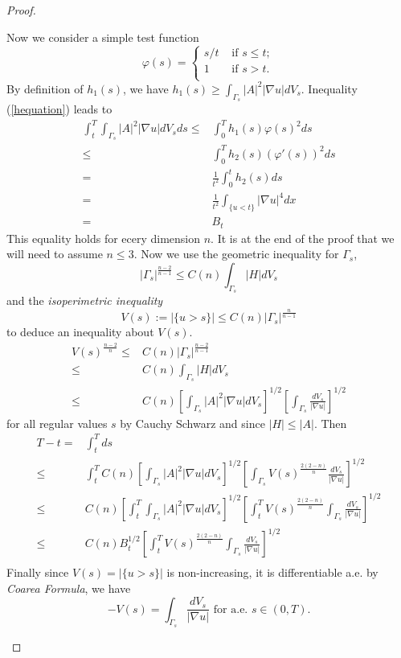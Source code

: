 \documentclass[paper=a4, fontsize=11pt]{scrartcl} %
\numberwithin{equation}{section} %
\numberwithin{figure}{section} %
\numberwithin{table}{section} %
\numberwithin{exercise}{section}
\begin{document}
\begin{proof}
\begin{itemize}
Now we consider a simple test function 
$$\varphi(s)=\begin{cases} s/t & \mbox{ if } s\leq t;\\
1 & \mbox{ if } s>t.\\
\end{cases}$$
By definition of $h_1(s)$, we have $ h_1(s) \geq \int _{\Gamma_s} |A|^2|\nabla u| dV_s.$ Inequality (\ref{hequation}) leads to 
\begin{align*}
\int_{t}^T\int _{\Gamma_s} |A|^2|\nabla u| dV_s ds\leq & \int_{0}^T h_1(s) \varphi(s)^2 ds\\
{}\leq & \int_{0}^T h_2(s) (\varphi'(s))^2 ds\\
{}=&\frac{1}{t^2} \int_{0}^t h_2(s) ds\\
{}=& \frac{1}{t^2} \int_{\{u<t\}} |\nabla u|^4 dx\\
{}=& B_t
\end{align*}
This equality holds for ecery dimension $n$. It is at the end of the proof that we will need to assume $n\leq 3.$
Now we use the geometric inequality for $\Gamma_s$,
$$|\Gamma_s|^{\frac{n-2}{n-1}}\leq C(n) \int_{\Gamma_s} |H| dV_s$$
 and the \emph{isoperimetric inequality}
 $$V(s):=|\{u>s \}|\leq C(n) |\Gamma_s|^{\frac{n}{n-1}}$$
 to deduce an inequality about $V(s)$.
 \begin{align*}
 V(s)^{\frac{n-2}{n}}\leq & C(n) |\Gamma_s|^{\frac{n-2}{n-1}}\\
 {}\leq & C(n) \int_{\Gamma_s} |H| dV_s \\
 {}\leq & C(n)\left[ \int_{\Gamma_s} |A|^2|\nabla u| dV_s\right]^{1/2} \left[\int_{\Gamma_s} \frac{dV_s}{|\nabla u|}\right]^{1/2}
 \end{align*}
 for all regular values $s$ by Cauchy Schwarz and since $|H|\leq |A|.$
 Then 
 \begin{align*}
 T-t=&\int_{t}^T ds\\
 {}\leq & \int_{t}^T C(n)\left[ \int_{\Gamma_s} |A|^2|\nabla u| dV_s\right]^{1/2}\left[\int_{\Gamma_s} V(s)^{\frac{2(2-n)}{n}} \frac{dV_s}{|\nabla u|}\right]^{1/2}\\
 {}\leq & C(n) \left[  \int_{t}^T \int_{\Gamma_s} |A|^2|\nabla u| dV_s\right]^{1/2}\left[ \int_{t}^TV(s)^{\frac{2(2-n)}{n}} \int_{\Gamma_s} \frac{dV_s}{|\nabla u|}\right]^{1/2}\\
 {}\leq &C(n) B_t^{1/2}  \left[ \int_{t}^TV(s)^{\frac{2(2-n)}{n}} \int_{\Gamma_s} \frac{dV_s}{|\nabla u|}\right]^{1/2}\\
 \end{align*}
 Finally since $V(s)=|\{u>s\}|$ is non-increasing, it is differentiable a.e. by \emph{Coarea Formula}, we have
 $$-V(s)=\int_{\Gamma_s} \frac{dV_s}{|\nabla u|}  \mbox{ for a.e. } s\in (0,T).$$
 

\end{itemize}
\end{proof}
\end{document}
